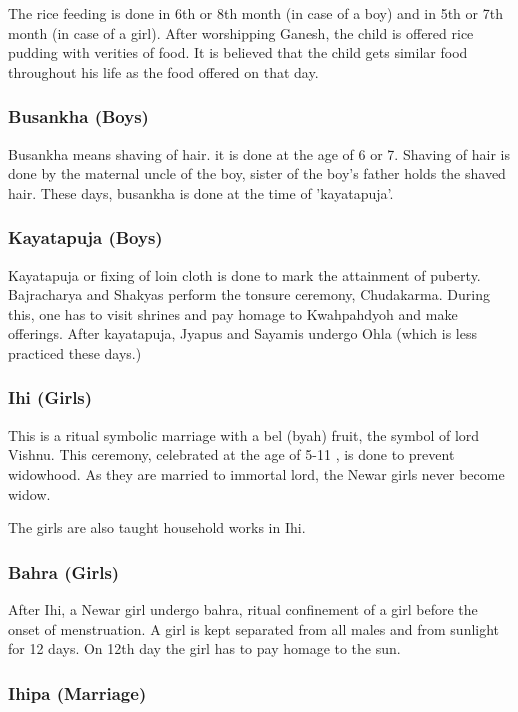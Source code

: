 \documentclass[a4paper,13pt, margin=0.9in]{article}
\begin{document}
\begin{flushleft}
	The rice feeding is done in 6th or 8th month (in case of a boy) and in 5th or 7th month (in case of a girl). After worshipping Ganesh, the child is offered rice pudding with verities of food. It is believed that the child gets similar food throughout his life as the food offered on that day.

	\subsubsection{Busankha (Boys)}

	Busankha means shaving of hair. it is done at the age of 6 or 7. Shaving of hair is done by the maternal uncle of the boy, sister of the boy's father holds the shaved hair. These days, busankha is done at the time of 'kayatapuja'.

	\subsubsection{Kayatapuja (Boys)}

	Kayatapuja or fixing of loin cloth is done to mark the attainment of puberty. Bajracharya and Shakyas perform the tonsure ceremony, Chudakarma. During this, one has to visit shrines and pay homage to Kwahpahdyoh and make offerings. After kayatapuja, Jyapus and Sayamis undergo Ohla (which is less practiced these days.)

	\subsubsection{Ihi (Girls)}

	This is a ritual symbolic marriage with a bel (byah) fruit, the symbol of lord Vishnu. This ceremony, celebrated at the age of 5-11 , is done to prevent widowhood. As they are married to immortal lord, the Newar girls never become widow.

	The girls are also taught household works in Ihi.

	\subsubsection{Bahra (Girls)}

	After Ihi, a Newar girl undergo bahra, ritual confinement of a girl before the onset of menstruation. A girl is kept separated from all males and from sunlight for 12 days. On 12th day the girl has to pay homage to the sun.

	\subsubsection{Ihipa (Marriage)}


\end{flushleft}
\end{document}
